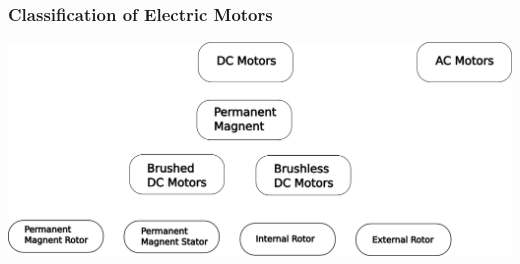 \documentclass[fleqn]{beamer} %
\newcommand{\sectiontitleI}{Classification of Electric Motors}
\begin{document}
	\begin{frame}[label=sectionI] \small
		\frametitle{\sectiontitleI}	
		
		\includegraphics[scale=0.25]{images/classes_of_motors.png}

	\end{frame}
\end{document}
